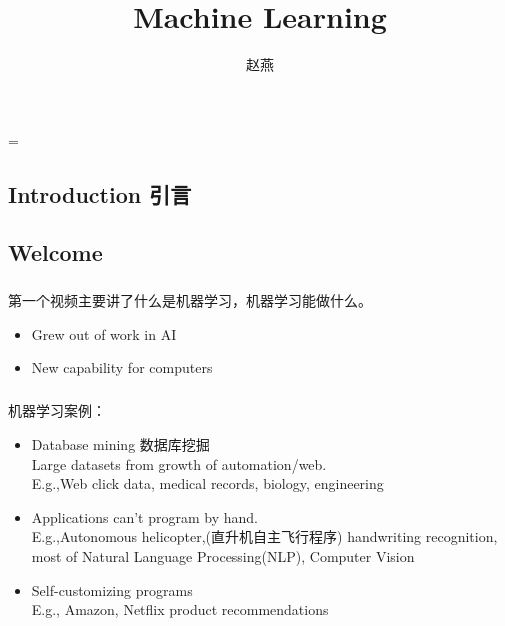 \documentclass{article}
\title{Machine Learning}
\author{赵燕}
\date{}
\begin{document}
 
\hfuzz=\maxdimen
{}
\begin{CJK}{UTF8}{gbsn} 
\maketitle
\renewcommand\contentsname{目录}
\renewcommand\figurename{图}
\tableofcontents
\newpage

\section{Introduction 引言}
\subsection{Welcome}
\subparagraph*{}
 第一个视频主要讲了什么是机器学习，机器学习能做什么。
\begin{itemize}
  \item Grew out of work in AI
  \item New capability for computers
\end{itemize}
\subparagraph*{}
 机器学习案例：
\begin{itemize}
  \item Database mining 数据库挖掘\\
   Large datasets from growth of automation/web.\\
   E.g.,Web click data, medical records, biology, engineering
  \item Applications can't program by hand.\\
   E.g.,Autonomous helicopter,(直升机自主飞行程序) handwriting recognition, most of Natural Language Processing(NLP), Computer Vision
  \item Self-customizing programs\\
   E.g., Amazon, Netflix product recommendations
\end{itemize}

\end{CJK}
\end{document}
